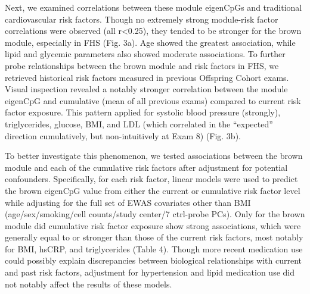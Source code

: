 \documentclass[]{article}
\theoremstyle{definition}
\theoremstyle{definition}
\theoremstyle{definition}
\theoremstyle{remark}
\begin{document}
Next, we examined correlations between these module eigenCpGs and
traditional cardiovascular risk factors. Though no extremely strong
module-risk factor correlations were observed (all
\textbar{}r\textbar{}\textless{}0.25), they tended to be stronger for
the brown module, especially in FHS (Fig. 3a). Age showed the greatest
association, while lipid and glycemic parameters also showed moderate
associations. To further probe relationships between the brown module
and risk factors in FHS, we retrieved historical risk factors measured
in previous Offspring Cohort exams. Visual inspection revealed a notably
stronger correlation between the module eigenCpG and cumulative (mean of
all previous exams) compared to current risk factor exposure. This
pattern applied for systolic blood pressure (strongly), triglycerides,
glucose, BMI, and LDL (which correlated in the ``expected'' direction
cumulatively, but non-intuitively at Exam 8) (Fig. 3b).

To better investigate this phenomenon, we tested associations between
the brown module and each of the cumulative risk factors after
adjustment for potential confounders. Specifically, for each risk
factor, linear models were used to predict the brown eigenCpG value
from either the current or cumulative risk factor level while adjusting
for the full set of EWAS covariates other than BMI (age/sex/smoking/cell
counts/study center/7 ctrl-probe PCs). Only for the brown module did
cumulative risk factor exposure show strong associations, which were
generally equal to or stronger than those of the current risk factors,
most notably for BMI, hsCRP, and triglycerides (Table 4). Though more
recent medication use could possibly explain discrepancies between
biological relationships with current and past risk factors, adjustment
for hypertension and lipid medication use did not notably affect the
results of these models.
\end{document}
